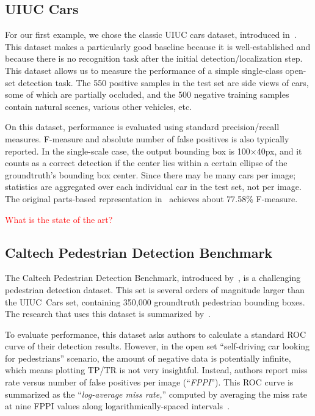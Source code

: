 \documentclass[10pt,twocolumn,letterpaper]{article}
\newcommand{\preliminary}[1]{\textcolor{red}{#1}}
\newcommand{\todo}{\colorbox{yellow}{\fbox{\LARGE{TODO}}}}
\begin{document}
\subsection{UIUC Cars}\label{sec:uiuc-cars}
For our first example, we chose the classic UIUC cars dataset, introduced in~\cite{agarwal2002learning,agarwal2004learning}. This dataset makes a particularly good baseline because it is well-established and because there is no recognition task after the initial detection/localization step. This dataset allows us to measure the performance of a simple single-class open-set detection task. The 550 positive samples in the test set are side views of cars, some of which are partially occluded, and the 500 negative training samples contain natural scenes, various other vehicles, etc.

On this dataset, performance is evaluated using standard precision/recall measures. F-measure and absolute number of false positives is also typically reported. In the single-scale case, the output bounding box is 100$\times$40px, and it counts as a correct detection if the center lies within a certain ellipse of the groundtruth's bounding box center. Since there may be many cars per image; statistics are aggregated over each individual car in the test set, not per image. The original parts-based representation in~\cite{agarwal2002learning} achieves about 77.58\% F-measure.

\preliminary{\todo What is the state of the art?}


\subsection{Caltech Pedestrian Detection Benchmark}
The Caltech Pedestrian Detection Benchmark, introduced by~\cite{dollarCVPR09peds}, is a challenging pedestrian detection dataset. This set is several orders of magnitude larger than the UIUC~Cars set, containing 350,000 groundtruth pedestrian bounding boxes. The research that uses this dataset is summarized by~\cite{Dollar2012PAMI}.

To evaluate performance, this dataset asks authors to calculate a standard ROC curve of their detection results. However, in the open set ``self-driving car looking for pedestrians'' scenario, the amount of negative data is potentially infinite, which means plotting TP/TR is not very insightful. Instead, authors report miss rate versus number of false positives per image (``\emph{FPPI}''). This ROC curve is summarized as the ``\emph{log-average miss rate,}'' computed by averaging the miss rate at nine FPPI values along logarithmically-spaced intervals~\cite{Dollar2012PAMI}.
\end{document}
